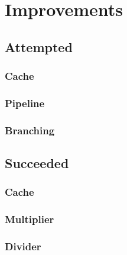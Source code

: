 \documentclass[final]{article}
\begin{document}
\section{Improvements}
\subsection{Attempted}
\subsubsection{Cache}
\subsubsection{Pipeline}
\subsubsection{Branching}
\subsection{Succeeded}
\subsubsection{Cache}
\subsubsection{Multiplier}
\subsubsection{Divider}
\end{document}
